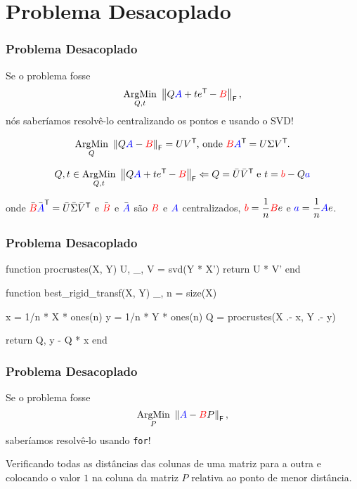 
\section{Problema Desacoplado}

\begin{frame}[fragile]
  \frametitle{Problema Desacoplado}

  \begin{center}
    Se o problema fosse \[\underset{Q,t}{\text{ArgMin}}\,\, \left\lVert Q\textcolor{blue}{A} + t e^{\mathsf{T}\mkern-1mu} - \textcolor{red}{B}\right\rVert_\mathsf{F},\] nós saberíamos resolvê-lo centralizando os pontos e usando o SVD!


  \[\underset{Q}{\text{ArgMin}}\,\, \left\lVert Q\textcolor{blue}{A} - \textcolor{red}{B}\right\rVert_\mathsf{F} = U V^{\mathsf{T}\mkern-1mu}\text{, onde } \textcolor{red}{B} \textcolor{blue}{A}^{\mathsf{T}\mkern-1mu} = U \Sigma V^{\mathsf{T}\mkern-1mu}.\]


  \[Q , t \in \underset{Q,t}{\text{ArgMin}}\,\, \left\lVert Q\textcolor{blue}{A} + t e^{\mathsf{T}\mkern-1mu} - \textcolor{red}{B}\right\rVert_\mathsf{F} \Leftarrow Q = \bar{U} \bar{V}^{\mathsf{T}\mkern-1mu} \text{ e } t = \textcolor{red}{b} - Q\textcolor{blue}{a}\]

  onde $\bar{\textcolor{red}{B}} \bar{\textcolor{blue}{A}}^{\mathsf{T}\mkern-1mu} = \bar{U} \bar{\Sigma} \bar{V}^{\mathsf{T}\mkern-1mu}$ e $\bar{\textcolor{red}{B}}$ e $\bar{\textcolor{blue}{A}}$ são $\textcolor{red}{B}$ e $\textcolor{blue}{A}$ centralizados, $\textcolor{red}{b} = \dfrac{1}{n} \textcolor{red}{B} e$ e $\textcolor{blue}{a} = \dfrac{1}{n} \textcolor{blue}{A} e$.
  \end{center}
\end{frame}

\begin{frame}[fragile]
  \frametitle{Problema Desacoplado}
  \begin{code}
    function procrustes(X, Y)
      U, _, V = svd(Y * X')
      return U * V'
    end
  \end{code}
  \begin{code}
    function best_rigid_transf(X, Y)
      _, n = size(X)

      x = 1/n * X * ones(n)
      y = 1/n * Y * ones(n)
      Q = procrustes(X .- x, Y .- y)

      return Q, y - Q * x
    end
  \end{code}
\end{frame}

\begin{frame}[fragile]
  \frametitle{Problema Desacoplado}

  \begin{center}
    Se o problema fosse \[\underset{P}{\text{ArgMin}}\,\, \left\lVert\textcolor{blue}{A} - \textcolor{red}{B}P\right\rVert_\mathsf{F},\] saberíamos resolvê-lo usando \texttt{for}!

    \vspace{1cm}
    Verificando todas as distâncias das colunas de uma matriz para a outra e colocando o valor $1$ na coluna da matriz $P$ relativa ao ponto de menor distância.
  \end{center}
\end{frame}

